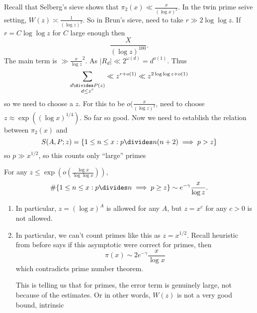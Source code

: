 \documentclass[a4paper]{article}
\begin{document}
Recall that Selberg's sieve shows that \(\pi_2(x) \ll \frac{x}{(\log x)^2}\). In the twin prime seive setting, \(W(z) \asymp \frac{1}{(\log z)^2}\). So in Brun's sieve, need to take \(r \gg 2 \log \log z\). If \(r = C \log \log z\) for \(C\) large enough then
\[
  \frac{X}{(\log z)^{100}}.
\]
The main term is \(\gg \frac{x}{\log z}^2\). As \(|R_d| \ll 2^{\omega(d)} = d^{o(1)}\). Thus
\[
  \sum_{\substack{d \divides P(z) \\ d \leq z^r}}
  \ll z^{r + o(1)}
  \ll z^{2 \log \log z + o(1)}
\]
so we need to choose a \(z\). For this to be \(o(\frac{x}{(\log z)^2}\), need to choose \(z \approx \exp((\log x)^{1/4})\). So far so good. Now we need to establish the relation between \(\pi_2(x)\) and
\[
  S(A, P; z) = \{1 \leq n \leq x: p \divides n(n + 2) \implies p > z\}
\]
so \(p \gg x^{1/2}\), so this counts only ``large'' primes

\begin{corollary}
  For any \(z \leq \exp (o(\frac{\log x}{\log \log x}))\),
  \[
    \#\{1 \leq n \leq x: p \divides n \implies p \geq z\} \sim e^{-\gamma} \frac{x}{\log z}.
  \]
\end{corollary}

\begin{remark}\leavevmode
  \begin{enumerate}
  \item In particular, \(z = (\log x)^A\) is allowed for any \(A\), but \(z = x^c\) for any \(c > 0\) is not allowed.
  \item In particular, we can't count primes like this as \(z = x^{1/2}\). Recall heuristic from before says if this asymptotic were correct for primes, then
    \[
      \pi(x) \sim 2e^{-\gamma} \frac{x}{\log x}
    \]
    which contradicts prime number theorem.

    This is telling us that for primes, the error term is genuinely large, not because of the estimates. Or in other words, \(W(z)\) is not a very good bound, intrinsic
  \end{enumerate}
\end{remark}
\end{document}
